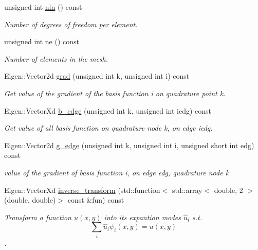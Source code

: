 \begin{DoxyCompactItemize}
unsigned int \hyperlink{classTspeed_1_1FESpace_ae32c88a6615cefdf1273e2525a62fcfe}{nln} () const 
\begin{DoxyCompactList}\small\item\em Number of degrees of freedom per element. \end{DoxyCompactList}\item 
unsigned int \hyperlink{classTspeed_1_1FESpace_a3e6a6031a7b2033f90ce1d0f3b6a378d}{ne} () const 
\begin{DoxyCompactList}\small\item\em Number of elements in the mesh. \end{DoxyCompactList}\item 
Eigen\-::\-Vector2d \hyperlink{classTspeed_1_1FESpace_a5b658aa075508f9ead3b4cac4743bfac}{grad} (unsigned int k, unsigned int i) const 
\begin{DoxyCompactList}\small\item\em Get value of the gradient of the basis function i on quadrature point k. \end{DoxyCompactList}\item 
Eigen\-::\-Vector\-Xd \hyperlink{classTspeed_1_1FESpace_afee2268392456e7b872a8c3d77f732c7}{b\-\_\-edge} (unsigned int k, unsigned int iedg) const 
\begin{DoxyCompactList}\small\item\em Get value of all basis function on quadrature node k, on edge iedg. \end{DoxyCompactList}\item 
Eigen\-::\-Vector2d \hyperlink{classTspeed_1_1FESpace_aee7e220399d909994b7b91f4fa82f1ca}{g\-\_\-edge} (unsigned int k, unsigned int i, unsigned short int edg) const 
\begin{DoxyCompactList}\small\item\em value of the gradient of basis function i, on edge edg, quadrature node k \end{DoxyCompactList}\item 
Eigen\-::\-Vector\-Xd \hyperlink{classTspeed_1_1FESpace_a37f34239467d7a425060025e9b794160}{inverse\-\_\-transform} (std\-::function$<$ std\-::array$<$ double, 2 $>$(double, double)$>$ const \&fun) const 
\begin{DoxyCompactList}\small\item\em Transform a function $u(x,y)$ into its expantion modes $\hat{u}_i$ s.\-t. \[ \sum_i \hat{u}_i\psi_i(x,y) = u(x,y) \]. \end{DoxyCompactList}\item 

\end{DoxyCompactItemize}
